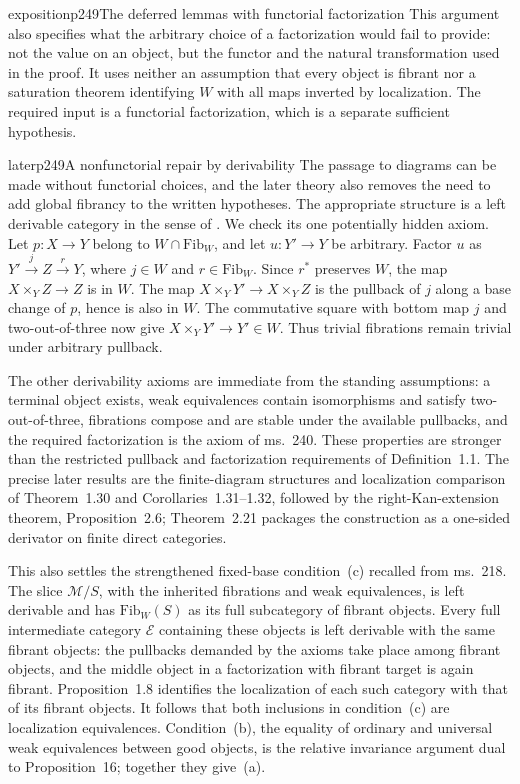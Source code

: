 \begin{dcomment}{exposition}{p249}{The deferred lemmas with functorial factorization}
This argument also specifies what the arbitrary choice of a factorization would fail to provide: not the value on an object, but the functor and the natural transformation used in the proof. It uses neither an assumption that every object is fibrant nor a saturation theorem identifying $W$ with all maps inverted by localization. The required input is a functorial factorization, which is a separate sufficient hypothesis.
\end{dcomment}

\begin{dcomment}{later}{p249}{A nonfunctorial repair by derivability}
The passage to diagrams can be made without functorial choices, and the later theory also removes the need to add global fibrancy to the written hypotheses. The appropriate structure is a left derivable category in the sense of \citet[Definition~1.1]{Cisinski2010}. We check its one potentially hidden axiom. Let $p:X\to Y$ belong to $W\cap\mathrm{Fib}_W$, and let $u:Y'\to Y$ be arbitrary. Factor $u$ as $Y'\xrightarrow{j}Z\xrightarrow{r}Y$, where $j\in W$ and $r\in\mathrm{Fib}_W$. Since $r^*$ preserves $W$, the map $X\times_Y Z\to Z$ is in $W$. The map $X\times_Y Y'\to X\times_Y Z$ is the pullback of $j$ along a base change of $p$, hence is also in $W$. The commutative square with bottom map $j$ and two-out-of-three now give $X\times_Y Y'\to Y'\in W$. Thus trivial fibrations remain trivial under arbitrary pullback.

The other derivability axioms are immediate from the standing assumptions: a terminal object exists, weak equivalences contain isomorphisms and satisfy two-out-of-three, fibrations compose and are stable under the available pullbacks, and the required factorization is the axiom of ms.~240. These properties are stronger than the restricted pullback and factorization requirements of Definition~1.1. The precise later results are the finite-diagram structures and localization comparison of Theorem~1.30 and Corollaries~1.31--1.32, followed by the right-Kan-extension theorem, Proposition~2.6; Theorem~2.21 packages the construction as a one-sided derivator on finite direct categories.

This also settles the strengthened fixed-base condition~(c) recalled from ms.~218. The slice $\mathcal M/S$, with the inherited fibrations and weak equivalences, is left derivable and has $\mathrm{Fib}_W(S)$ as its full subcategory of fibrant objects. Every full intermediate category $\mathcal E$ containing these objects is left derivable with the same fibrant objects: the pullbacks demanded by the axioms take place among fibrant objects, and the middle object in a factorization with fibrant target is again fibrant. Proposition~1.8 identifies the localization of each such category with that of its fibrant objects. It follows that both inclusions in condition~(c) are localization equivalences. Condition~(b), the equality of ordinary and universal weak equivalences between good objects, is the relative invariance argument dual to Proposition~16; together they give~(a).


\end{dcomment}
